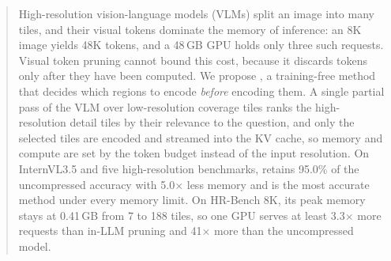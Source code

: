 \begin{abstract}
High-resolution vision-language models (VLMs) split an image into many tiles, and their visual tokens
dominate the memory of inference: an 8K image yields 48K tokens, and a 48\,GB GPU holds only three such
requests. Visual token pruning cannot bound this cost, because it discards tokens only after they have
been computed. We propose \method, a training-free method that decides which regions to encode
\emph{before} encoding them. A single partial pass of the VLM over low-resolution coverage tiles ranks
the high-resolution detail tiles by their relevance to the question, and only the selected tiles are
encoded and streamed into the KV cache, so memory and compute are set by the token budget instead of the
input resolution. On InternVL3.5 and five high-resolution benchmarks, \method retains 95.0\% of the
uncompressed accuracy with 5.0$\times$ less memory and is the most accurate method under every memory
limit. On HR-Bench 8K, its peak memory stays at 0.41\,GB from 7 to 188 tiles, so one GPU serves at least 3.3$\times$
more requests than in-LLM pruning and 41$\times$ more than the uncompressed model.
\end{abstract}
